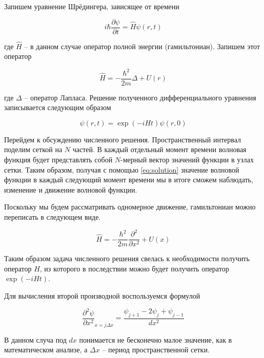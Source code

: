 \documentclass[a4paper, 12pt]{article}
\begin{document}
    Запишем уравнение Шрёдингера, зависящее от времени

    \begin{equation}
        i \hbar \frac{\partial \psi}{\partial t} = \hat{H} \psi(r, t)
    \end{equation}

    где $\hat{H}$ -- в данном случае оператор полной энергии (гамильтониан). Запишем этот оператор

    \begin{equation}
        \hat{H} = - \frac{\hbar^2}{2m} \Delta + U(r)
    \end{equation}

    где $\Delta$ -- оператор Лапласа. Решение полученного дифференциального уравнения записывается следующим образом

    \begin{equation} \label{eq:solution}
        \psi(r, t) = \exp(-i H t) \psi(r, 0)
    \end{equation}
    
    Перейдем к обсуждению численного решения. Пространственный интервал поделим сеткой на $N$ частей.
    В каждый отдельный момент времени волновая функция будет представлять собой $N$-мерный вектор значений функции
    в узлах сетки. Таким образом, получая с помощью \eqref{eq:solution} значение волновой функции в каждый следующий
    момент времени мы в итоге сможем наблюдать, изменение и движение волновой функции.
    
    Поскольку мы будем рассматривать одномерное движение, гамильтониан можно переписать
    в следующем виде.

    \begin{equation}
        \hat{H} = - \frac{\hbar^2}{2m} \frac{\partial^2}{\partial x^2} + U(x)
    \end{equation}

    Таким образом задача численного решения свелась к необходимости получить оператор $H$, из которого в последствии можно
    будет получить оператор $\exp(-i H t)$.

    Для вычисления второй производной воспользуемся формулой

    \begin{equation}
        \frac{\partial^2 \psi}{\partial x^2} _{x = j \Delta x} = \frac{\psi_{j+1} - 2\psi_{j} + \psi_{j-1}}{dx^2}
    \end{equation}

    В данном случа под $dx$ понимается не бесконечно малое значение, как в математическом анализе, а $\Delta x$ -- 
    период пространственной сетки.
    
\end{document}
